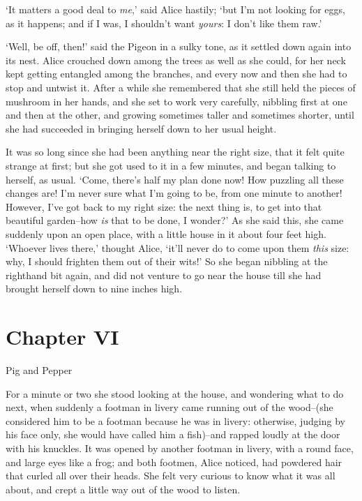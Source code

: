   `It matters a good deal to {\it me},' said Alice hastily; `but I'm
not looking for eggs, as it happens; and if I was, I shouldn't
want {\it yours}:  I don't like them raw.'

  `Well, be off, then!' said the Pigeon in a sulky tone, as it
settled down again into its nest.  Alice crouched down among the
trees as well as she could, for her neck kept getting entangled
among the branches, and every now and then she had to stop and
untwist it.  After a while she remembered that she still held the
pieces of mushroom in her hands, and she set to work very
carefully, nibbling first at one and then at the other, and
growing sometimes taller and sometimes shorter, until she had
succeeded in bringing herself down to her usual height.

  It was so long since she had been anything near the right size,
that it felt quite strange at first; but she got used to it in a
few minutes, and began talking to herself, as usual.  `Come,
there's half my plan done now!  How puzzling all these changes
are!  I'm never sure what I'm going to be, from one minute to
another!  However, I've got back to my right size:  the next
thing is, to get into that beautiful garden--how {\it is} that to be
done, I wonder?'  As she said this, she came suddenly upon an
open place, with a little house in it about four feet high.
`Whoever lives there,' thought Alice, `it'll never do to come
upon them {\it this} size:  why, I should frighten them out of their
wits!'  So she began nibbling at the righthand bit again, and did
not venture to go near the house till she had brought herself
down to nine inches high.



\chapter{Chapter VI}{Pig and Pepper}


  For a minute or two she stood looking at the house, and
wondering what to do next, when suddenly a footman in livery came
running out of the wood--(she considered him to be a footman
because he was in livery:  otherwise, judging by his face only,
she would have called him a fish)--and rapped loudly at the door
with his knuckles.  It was opened by another footman in livery,
with a round face, and large eyes like a frog; and both footmen,
Alice noticed, had powdered hair that curled all over their
heads.  She felt very curious to know what it was all about, and
crept a little way out of the wood to listen.

